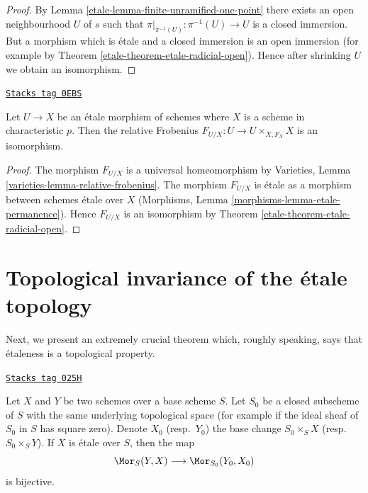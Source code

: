 \begin{proof}

By
Lemma \ref{etale-lemma-finite-unramified-one-point}
there exists an open neighbourhood $U$ of $s$ such that
$\pi|_{\pi^{-1}(U)} : \pi^{-1}(U) \to U$ is a closed immersion.
But a morphism which is \'etale and a closed immersion is an
open immersion (for example by
Theorem \ref{etale-theorem-etale-radicial-open}).
Hence after shrinking $U$ we obtain an isomorphism.
\end{proof}

\begin{lemma}
\label{etale-lemma-relative-frobenius-etale}
\href{https://stacks.math.columbia.edu/tag/0EBS}{\texttt{Stacks tag 0EBS}}

Let $U \to X$ be an \'etale morphism of schemes
where $X$ is a scheme in characteristic $p$.
Then the relative Frobenius $F_{U/X} : U \to U \times_{X, F_X} X$
is an isomorphism.
\end{lemma}

\begin{proof}

The morphism $F_{U/X}$ is a universal homeomorphism by
Varieties, Lemma \ref{varieties-lemma-relative-frobenius}.
The morphism $F_{U/X}$ is \'etale as a
morphism between schemes \'etale over $X$
(Morphisms, Lemma \ref{morphisms-lemma-etale-permanence}).
Hence $F_{U/X}$ is an isomorphism by
Theorem \ref{etale-theorem-etale-radicial-open}.
\end{proof}

\section{Topological invariance of the \'etale topology}
\label{etale-section-topological-invariance}
Next, we present an extremely crucial theorem which, roughly speaking, says
that \'etaleness is a topological property.

\begin{theorem}
\label{etale-theorem-etale-topological}
\href{https://stacks.math.columbia.edu/tag/025H}{\texttt{Stacks tag 025H}}

Let $X$ and $Y$ be two schemes over a base scheme $S$. Let $S_0$ be a closed
subscheme of $S$ with the same underlying topological space
(for example if the ideal sheaf of $S_0$ in $S$ has square zero).
Denote $X_0$ (resp.\ $Y_0$) the base change $S_0 \times_S X$
(resp.\ $S_0 \times_S Y$).
If $X$ is \'etale over $S$, then the map
$$
\Mor_S(Y, X) \longrightarrow \Mor_{S_0}(Y_0, X_0)
$$
is bijective.
\end{theorem}

